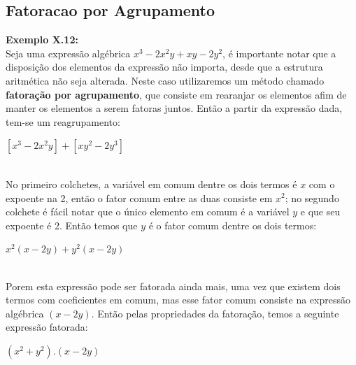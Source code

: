 \documentclass[a4paper,12pt,twoside,BCOR=10mm]{scrbook}
\begin{document}
\begin{titlepage}
\subsection{Fatoracao por Agrupamento}
\textbf{Exemplo X.12:}
\\
Seja uma expressão algébrica $x^{3} - 2x^{2}y + xy - 2y^{2}$, é importante notar que a disposição dos elementos da expressão não importa, desde que a estrutura aritmética não seja alterada. Neste caso utilizaremos um método chamado \textbf{fatoração por agrupamento}, que consiste em rearanjar os elementos afim de manter os elementos a serem fatoras juntos. Então a partir da expressão dada, tem-se um reagrupamento:
\\
\begin{center}
$[x^{3} - 2x^{2}y] + [xy^{2} - 2y^{3} ]$ 
\end{center}
\\	
No primeiro colchetes, a variável em comum dentre os dois termos é $x$ com o expoente na 2, então o fator comum entre as duas consiste em $x^{2}$; no segundo colchete é fácil notar que o único elemento em comum é a variável $y$ e que seu expoente é 2. Então temos que $y$ é o fator comum dentre os dois termos:
\\
\begin{center}
$x^{2}(x - 2y) + y^{2}(x - 2y)$ 
\end{center}
\\
Porem esta expressão pode ser fatorada ainda mais, uma vez que existem dois termos com coeficientes em comum, mas esse fator comum consiste na expressão algébrica $(x - 2y)$. Então pelas propriedades da fatoração, temos a seguinte expressão fatorada:
\\
\begin{center}
$(x^{2} + y^{2}).(x - 2y)$
\end{center}
\\

\end{titlepage}
\end{document}
